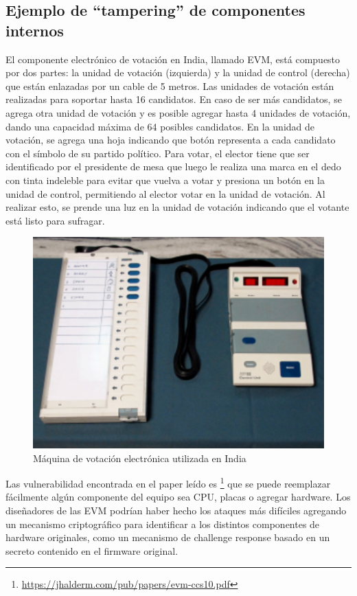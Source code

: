 \subsection{Ejemplo de ``tampering'' de componentes internos}

El componente electrónico de votación en India, llamado EVM, está compuesto por dos partes: la unidad de votación (izquierda) y la unidad de control (derecha) que están enlazadas por un cable de 5 metros. Las unidades de votación están realizadas para soportar hasta 16 candidatos. En caso de ser más candidatos, se agrega otra unidad de votación y es posible agregar hasta 4 unidades de votación, dando una capacidad máxima de 64 posibles candidatos. En la unidad de votación, se agrega una hoja indicando que botón representa a cada candidato con el símbolo de su partido político. Para votar, el elector tiene que ser identificado por el presidente de mesa que luego le realiza una marca en el dedo con tinta indeleble para evitar que vuelva a votar y presiona un botón en la unidad de control, permitiendo al elector votar en la unidad de votación. Al realizar esto, se prende una luz en la unidad de votación indicando que el votante está listo para sufragar.

\begin{figure}[h]
\includegraphics{Imagenes/almacenamiento1}
\caption{Máquina de votación electrónica utilizada en India}
\end{figure}

Las vulnerabilidad encontrada en el paper leído es
\footnote{\url{https://jhalderm.com/pub/papers/evm-ccs10.pdf}}
que se puede reemplazar fácilmente algún componente del equipo sea CPU, placas o agregar hardware. Los diseñadores de las EVM podrían haber hecho los ataques más difíciles agregando un mecanismo criptográfico para identificar a los distintos componentes de hardware originales, como un mecanismo de challenge response basado en un secreto contenido en el firmware original.

